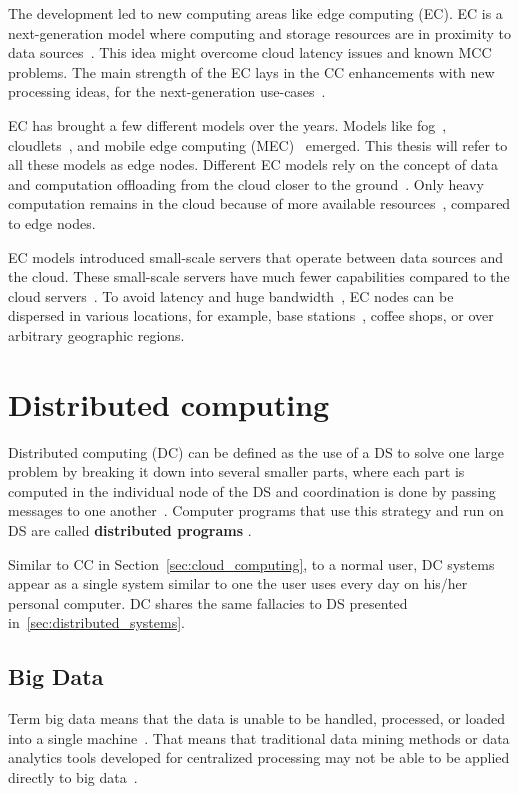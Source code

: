 The development led to new computing areas like edge computing (EC). EC is a next-generation model where computing and storage resources are in proximity to data sources~\cite{Satyanarayanan17}. This idea might overcome cloud latency issues and known MCC problems. The main strength of the EC lays in the CC enhancements with new processing ideas, for the next-generation use-cases~\cite{NingLSY20}. 

EC has brought a few different models over the years. Models like fog~\cite{BonomiMNZ14}, cloudlets~\cite{MonsalveCC18}, and mobile edge computing (MEC)~\cite{WangZZWYW17} emerged. This thesis will refer to all these models as edge nodes. Different EC models rely on the concept of data and computation offloading from the cloud closer to the ground~\cite{KhuneP19}. Only heavy computation remains in the cloud because of more available resources~\cite{NingLSY20}, compared to edge nodes. 

EC models introduced small-scale servers that operate between data sources and the cloud. These small-scale servers have much fewer capabilities compared to the cloud servers~\cite{ChenHLLW15}. To avoid latency and huge bandwidth~\cite{MonsalveCC18}, EC nodes can be dispersed in various locations, for example, base stations~\cite{WangZZWYW17}, coffee shops, or over arbitrary geographic regions.
%
%
\section{Distributed computing}\label{sec:distributed_computing}
%
Distributed computing (DC) can be defined as the use of a DS to solve one large problem by breaking it down into several smaller parts, where each part is computed in the individual node of the DS and coordination is done by passing messages to one another~\cite{0019513}. Computer programs that use this strategy and run on DS are called \textbf{distributed programs} \cite{Vera16, andrews2000foundations}. 

Similar to CC in Section~\ref{sec:cloud_computing}, to a normal user, DC systems appear as a single system similar to one the user uses every day on his/her personal computer. DC shares the same fallacies to DS presented in~\ref{sec:distributed_systems}.
%
%
\subsection{Big Data}\label{sec:big_data}
%
Term big data means that the data is unable to be handled, processed, or loaded into a single machine~\cite{FisherDCD12}. That means that traditional data mining methods or data analytics tools developed for centralized processing may not be able to be applied directly to big data~\cite{Tsai2015}. 


